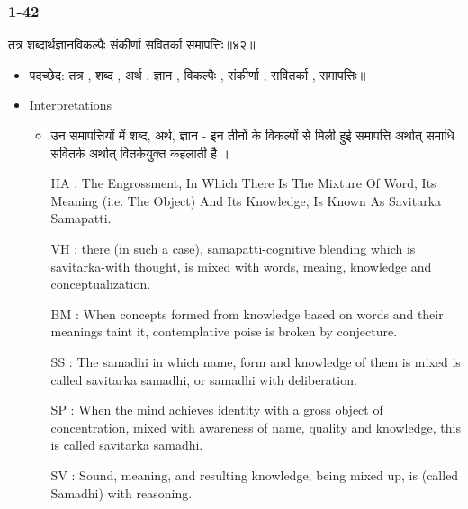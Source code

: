 \begin{frame}[fragile]\frametitle{1-42}
\begin{sanskrit}
तत्र शब्दार्थज्ञानविकल्पैः संकीर्णा सवितर्का समापत्तिः॥४२॥
\end{sanskrit}

	\begin{itemize}
	\item पदच्छेद: तत्र , शब्द , अर्थ , ज्ञान , विकल्पैः , संकीर्णा , सवितर्का , समापत्तिः॥
	\item Interpretations
		\begin{itemize}
		\item उन समापत्तियों में शब्द, अर्थ, ज्ञान - इन तीनों के विकल्पों से मिली हुई समापत्ति अर्थात् समाधि सवितर्क अर्थात् वितर्कयुक्त कहलाती है ।
		\item [HA]: The Engrossment, In Which There Is The Mixture Of Word, Its Meaning (i.e. The Object) And Its Knowledge, Is Known As Savitarka Samapatti.
		\item [VH]: there (in such a case), samapatti-cognitive blending which is savitarka-with thought, is mixed with words, meaing, knowledge and conceptualization.
		\item [BM]: When concepts formed from knowledge based on words and their meanings taint it, contemplative poise is broken by conjecture.
		\item [SS]: The samadhi in which name, form and knowledge of them is mixed is called savitarka samadhi, or samadhi with deliberation.
		\item [SP]: When the mind achieves identity with a gross object of concentration, mixed with awareness of name, quality and knowledge, this is called savitarka samadhi.
		\item [SV]: Sound, meaning, and resulting knowledge, being mixed up, is (called Samadhi) with reasoning.
		\end{itemize}
	\end{itemize}
	
\end{frame}


